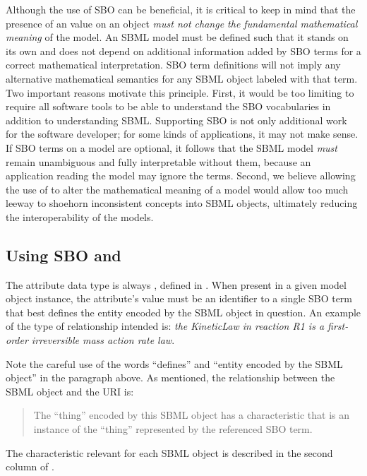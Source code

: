 Although the use of SBO can be beneficial, it is critical to keep
in mind that the presence of an  value on an object
\emph{must not change the fundamental mathematical meaning} of the
model.  An SBML model must be defined such that it stands on its
own and does not depend on additional information added by SBO
terms for a correct mathematical interpretation.  SBO term
definitions will not imply any alternative mathematical semantics
for any SBML object labeled with that term.  Two important
reasons motivate this principle.  First, it would be too limiting
to require all software tools to be able to understand the SBO
vocabularies in addition to understanding SBML.
Supporting SBO is not only additional work for the software
developer; for some kinds of applications, it may not make sense.
If SBO terms on a model are optional, it follows that the SBML
model \emph{must} remain unambiguous and fully interpretable
without them, because an application reading the model may ignore
the terms.  Second, we believe allowing the use of 
to alter the mathematical meaning of a model would allow
  too much leeway to shoehorn inconsistent concepts into SBML
objects, ultimately reducing the interoperability of the
models.

\subsection{Using SBO and }

The  attribute data type is always
, defined in .
When present in a given model object instance, the
attribute's value must be an identifier 
to a single SBO term that best defines the entity encoded by
the SBML object in question.  An example of the type of
relationship intended is: \emph{the KineticLaw in reaction R1 is a
  first-order irreversible mass action rate law}.

Note the careful use of the words ``defines'' and ``entity encoded
by the SBML object'' in the paragraph above.  As mentioned, the
relationship between the SBML object and the URI is:

\begin{quote}
  The ``thing'' encoded by this SBML object has a characteristic
  that is an instance of the ``thing'' represented by the
  referenced SBO term.
\end{quote}

The characteristic relevant for each SBML object is described in
the second column of .


